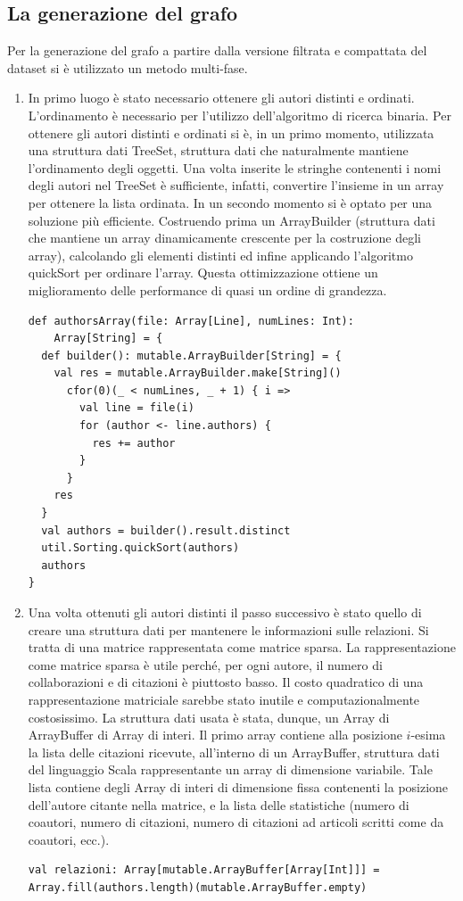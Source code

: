 \documentclass[a4paper, 12pt]{article}
\begin{document}
\subsection{La generazione del grafo}
Per la generazione del grafo a partire dalla versione filtrata e compattata del dataset si è utilizzato un metodo multi-fase.
\begin{enumerate}
  \item In primo luogo è stato necessario ottenere gli autori distinti e ordinati. L'ordinamento è necessario per l'utilizzo dell'algoritmo di ricerca binaria. Per ottenere gli autori distinti e ordinati si è, in un primo momento, utilizzata una struttura dati TreeSet, struttura dati che naturalmente mantiene l'ordinamento degli oggetti. Una volta inserite le stringhe contenenti i nomi degli autori nel TreeSet è sufficiente, infatti, convertire l'insieme in un array per ottenere la lista ordinata. In un secondo momento si è optato per una soluzione più efficiente. Costruendo prima un ArrayBuilder (struttura dati che mantiene un array dinamicamente crescente per la costruzione degli array), calcolando gli elementi distinti ed infine applicando l'algoritmo quickSort per ordinare l'array. Questa ottimizzazione ottiene un miglioramento delle performance di quasi un ordine di grandezza.
  \begin{lstlisting}[keepspaces=true]
def authorsArray(file: Array[Line], numLines: Int):
    Array[String] = {
  def builder(): mutable.ArrayBuilder[String] = {
    val res = mutable.ArrayBuilder.make[String]()
      cfor(0)(_ < numLines, _ + 1) { i =>
        val line = file(i)
        for (author <- line.authors) {
          res += author
        }
      }
    res
  }
  val authors = builder().result.distinct
  util.Sorting.quickSort(authors)
  authors
}    
  \end{lstlisting}
  \item Una volta ottenuti gli autori distinti il passo successivo è stato quello di creare una struttura dati per mantenere le informazioni sulle relazioni. Si tratta di una matrice rappresentata come matrice sparsa. La rappresentazione come matrice sparsa è utile perché, per ogni autore, il numero di collaborazioni e di citazioni è piuttosto basso. Il costo quadratico di una rappresentazione matriciale sarebbe stato inutile e computazionalmente costosissimo. La struttura dati usata è stata, dunque, un Array di ArrayBuffer di Array di interi. Il primo array contiene alla posizione $i$-esima la lista delle citazioni ricevute, all'interno di un ArrayBuffer, struttura dati del linguaggio Scala rappresentante un array di dimensione variabile. Tale lista contiene degli Array di interi di dimensione fissa contenenti la posizione dell'autore citante nella matrice, e la lista delle statistiche (numero di coautori, numero di citazioni, numero di citazioni ad articoli scritti come da coautori, ecc.).
  \begin{lstlisting}[keepspaces=true]
val relazioni: Array[mutable.ArrayBuffer[Array[Int]]] = Array.fill(authors.length)(mutable.ArrayBuffer.empty)


\end{lstlisting}
\end{enumerate}
\end{document}
